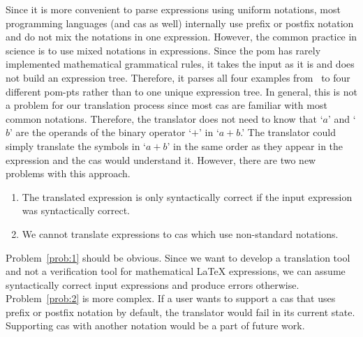 \documentclass[a4paper,11pt]{article}
\theoremstyle{defTheoStyle}
\theoremstyle{defExampStyle}
\begin{document}
Since it is more convenient to parse expressions using uniform notations, most programming 
languages (and \gls*{cas} as well) internally use prefix or postfix notation and do not mix 
the notations in one expression.
However, the common practice in science is to use mixed notations in expressions. Since the \gls*{pom} has rarely implemented mathematical grammatical rules, it takes the input as it is and does not build an expression tree. Therefore, it parses all four examples from~ to four different \gls*{pom-pt}s rather than to one unique expression tree. In general, this is not a problem for our translation process since most \gls*{cas} are familiar with most common notations. Therefore, the translator does not need to know that `$a$' and `$b$' are the operands of the binary operator `$+$' in `$a+b$.' The translator could simply translate the symbols in `$a+b$' in the same order as they appear in the expression and the \gls*{cas} would understand it. However, there are two new problems with this approach.
\begin{enumerate}\item \label{prob:1} The translated expression is only syntactically correct if the input expression was syntactically correct.
\item \label{prob:2} We cannot translate expressions to \gls*{cas} which use non-standard notations.
\end{enumerate}

Problem~\ref{prob:1} should be obvious. Since we want to develop a translation tool and not a verification tool for mathematical \LaTeX{} expressions, we can assume syntactically correct input expressions and produce errors otherwise. Problem~\ref{prob:2} is more complex. If a user wants to support a \gls*{cas} that uses prefix or postfix notation by default, the translator would fail in its current state. Supporting \gls*{cas} with another notation would be a part of future work.
\end{document}
